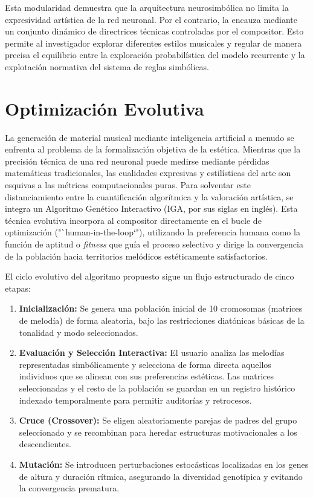 \documentclass[12pt]{report}
\begin{document}
Esta modularidad demuestra que la arquitectura neurosimbólica no limita la expresividad artística de la red neuronal. Por el contrario, la encauza mediante un conjunto dinámico de directrices técnicas controladas por el compositor. Esto permite al investigador explorar diferentes estilos musicales y regular de manera precisa el equilibrio entre la exploración probabilística del modelo recurrente y la explotación normativa del sistema de reglas simbólicas.

\section{Optimización Evolutiva}

La generación de material musical mediante inteligencia artificial a menudo se enfrenta al problema de la formalización objetiva de la estética. Mientras que la precisión técnica de una red neuronal puede medirse mediante pérdidas matemáticas tradicionales, las cualidades expresivas y estilísticas del arte son esquivas a las métricas computacionales puras. Para solventar este distanciamiento entre la cuantificación algorítmica y la valoración artística, se integra un Algoritmo Genético Interactivo (IGA, por sus siglas en inglés). Esta técnica evolutiva incorpora al compositor directamente en el bucle de optimización ("`human-in-the-loop`"), utilizando la preferencia humana como la función de aptitud o \textit{fitness} que guía el proceso selectivo y dirige la convergencia de la población hacia territorios melódicos estéticamente satisfactorios.

El ciclo evolutivo del algoritmo propuesto sigue un flujo estructurado de cinco etapas:
\begin{enumerate}
    \item \textbf{Inicialización:} Se genera una población inicial de 10 cromosomas (matrices de melodía) de forma aleatoria, bajo las restricciones diatónicas básicas de la tonalidad y modo seleccionados.
    \item \textbf{Evaluación y Selección Interactiva:} El usuario analiza las melodías representadas simbólicamente y selecciona de forma directa aquellos individuos que se alinean con sus preferencias estéticas.
     Las matrices seleccionadas y el resto de la población se guardan en un registro histórico indexado temporalmente para permitir auditorías y retrocesos.
    \item \textbf{Cruce (Crossover):} Se eligen aleatoriamente parejas de padres del grupo seleccionado y se recombinan para heredar estructuras motivacionales a los descendientes.
    \item \textbf{Mutación:} Se introducen perturbaciones estocásticas localizadas en los genes de altura y duración rítmica, asegurando la diversidad genotípica y evitando la convergencia prematura.
\end{enumerate}
\end{document}
